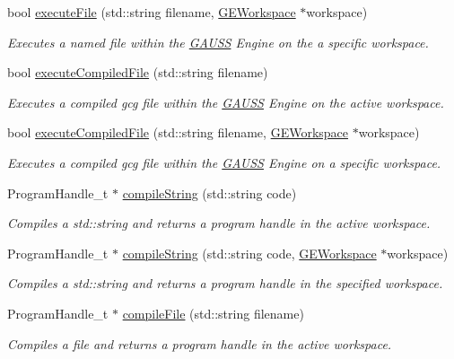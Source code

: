\begin{DoxyCompactItemize}
bool \hyperlink{class_g_a_u_s_s_a7d4b858cf5909ffaf97dbf3d10bb753e}{execute\+File} (std\+::string filename, \hyperlink{class_g_e_workspace}{G\+E\+Workspace} $\ast$workspace)
\begin{DoxyCompactList}\small\item\em Executes a named file within the \hyperlink{class_g_a_u_s_s}{G\+A\+U\+SS} Engine on the a specific workspace. \end{DoxyCompactList}\item 
bool \hyperlink{class_g_a_u_s_s_ac2624100ec1467f7c7b0626973c7e1fc}{execute\+Compiled\+File} (std\+::string filename)
\begin{DoxyCompactList}\small\item\em Executes a compiled gcg file within the \hyperlink{class_g_a_u_s_s}{G\+A\+U\+SS} Engine on the active workspace. \end{DoxyCompactList}\item 
bool \hyperlink{class_g_a_u_s_s_a910fde00b8ff18303cae28aec3fbc447}{execute\+Compiled\+File} (std\+::string filename, \hyperlink{class_g_e_workspace}{G\+E\+Workspace} $\ast$workspace)
\begin{DoxyCompactList}\small\item\em Executes a compiled gcg file within the \hyperlink{class_g_a_u_s_s}{G\+A\+U\+SS} Engine on a specific workspace. \end{DoxyCompactList}\item 
Program\+Handle\+\_\+t $\ast$ \hyperlink{class_g_a_u_s_s_a3ecf1522874c8ae5aa8fb8173d515b73}{compile\+String} (std\+::string code)
\begin{DoxyCompactList}\small\item\em Compiles a std\+::string and returns a program handle in the active workspace. \end{DoxyCompactList}\item 
Program\+Handle\+\_\+t $\ast$ \hyperlink{class_g_a_u_s_s_a5707d1f8b1d7bbdba9364cccb40f165b}{compile\+String} (std\+::string code, \hyperlink{class_g_e_workspace}{G\+E\+Workspace} $\ast$workspace)
\begin{DoxyCompactList}\small\item\em Compiles a std\+::string and returns a program handle in the specified workspace. \end{DoxyCompactList}\item 
Program\+Handle\+\_\+t $\ast$ \hyperlink{class_g_a_u_s_s_a981bdafede1af555a73b9abe05333341}{compile\+File} (std\+::string filename)
\begin{DoxyCompactList}\small\item\em Compiles a file and returns a program handle in the active workspace. \end{DoxyCompactList}\item 

\end{DoxyCompactItemize}
